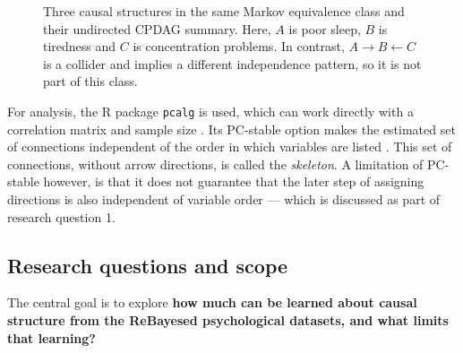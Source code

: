 \documentclass[11pt,a4paper]{article}
\begin{document}
\begin{figure}[!htbp]
\centering
{}
\caption{Three causal structures in the same Markov equivalence class and their undirected CPDAG summary. Here, $A$ is poor sleep, $B$ is tiredness and $C$ is concentration problems. In contrast, $A\to B\leftarrow C$ is a collider and implies a different independence pattern, so it is not part of this class.}
\label{fig:equivalence}
\end{figure}
\FloatBarrier

For analysis, the R package \texttt{pcalg} is used, which can work directly with a correlation matrix and sample size \citep{kalisch2012}. Its PC-stable option makes the estimated set of connections independent of the order in which variables are listed \citep{colombo2014}. This set of connections, without arrow directions, is called the \emph{skeleton}. A limitation of PC-stable however, is that it does not guarantee that the later step of assigning directions is also independent of variable order — which is discussed as part of research question 1. 

\subsection{Research questions and scope}
The central goal is to explore \textbf{how much can be learned about causal structure from the ReBayesed psychological datasets, and what limits that learning?}
\end{document}
